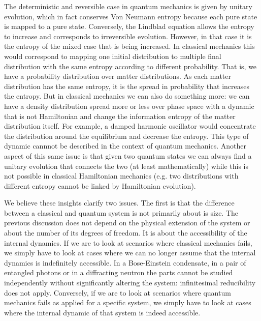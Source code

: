 \documentclass{ws-ijqi}
\begin{document}
The deterministic and reversible case in quantum mechanics is given by unitary evolution, which in fact conserves Von Neumann entropy because each pure state is mapped to a pure state. Conversely, the Lindblad equation allows the entropy to increase and corresponds to irreversible evolution. However, in that case it is the entropy of the mixed case that is being increased. In classical mechanics this would correspond to mapping one initial distribution to multiple final distribution with the same entropy according to different probability. That is, we have a probability distribution over matter distributions. As each matter distribution has the same entropy, it is the spread in probability that increases the entropy. But in classical mechanics we can also do something more: we can have a density distribution spread more or less over phase space with a dynamic that is not Hamiltonian and change the information entropy of the matter distribution itself. For example, a damped harmonic oscillator would concentrate the distribution around the equilibrium and decrease the entropy. This type of dynamic cannnot be described in the context of quantum mechanics. Another aspect of this same issue is that given two quantum states we can always find a unitary evolution that connects the two (at least mathematically) while this is not possible in classical Hamiltonian mechanics (e.g. two distributions with different entropy cannot be linked by Hamiltonian evolution).

We believe these insights clarify two issues. The first is that the difference between a classical and quantum system is not primarily about is size. The previous discussion does not depend on the physical extension of the system or about the number of its degrees of freedom. It is about the accessibility of the internal dynamics. If we are to look at scenarios where classical mechanics fails, we simply have to look at cases where we can no longer assume that the internal dynamics is indefinitely accessible. In a Bose-Einstein condensate, in a pair of entangled photons or in a diffracting neutron the parts cannot be studied independently without significantly altering the system: infinitesimal reducibility does not apply. Conversely, if we are to look at scenarios where quantum mechanics fails as applied for a specific system, we simply have to look at cases where the internal dynamic of that system is indeed accessible.
\end{document}

